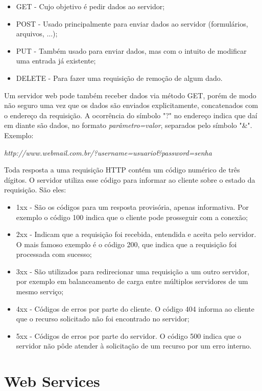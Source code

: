 \begin{itemize}
\item GET - Cujo objetivo é pedir dados ao servidor;
\item POST - Usado principalmente para enviar dados ao servidor (formulários, arquivos, ...);
\item PUT - Também usado para enviar dados, mas com o intuito de modificar uma entrada já existente;
\item DELETE - Para fazer uma requisição de remoção de algum dado.
\end{itemize}
 
Um servidor web pode também receber dados via método GET, porém de modo não seguro uma vez que os dados são enviados explicitamente, concatenados com o endereço da requisição. A ocorrência do símbolo "?" no endereço indica que daí em diante são dados, no formato \emph{parâmetro=valor}, separados pelo símbolo "\&". Exemplo:
\begin{center}
\emph{http://www.webmail.com.br/?username=usuario\&password=senha}
\end{center}

Toda resposta a uma requisição HTTP contém um código numérico de três dígitos. O servidor utiliza esse código para informar ao cliente sobre o estado da requisição. São eles:

\begin{itemize}
\item 1xx - São os códigos para um resposta provisória, apenas informativa. Por exemplo o código 100 indica que o cliente pode prosseguir com a conexão;
\item 2xx - Indicam que a requisição foi recebida, entendida e aceita pelo servidor. O mais famoso exemplo é o código 200, que indica que a requisição foi processada com sucesso;
\item 3xx - São utilizados para redirecionar uma requisição a um outro servidor, por exemplo em balanceamento de carga entre múltiplos servidores de um mesmo serviço;
\item 4xx - Códigos de erros por parte do cliente. O código 404 informa ao cliente que o recurso solicitado não foi encontrado no servidor;
\item 5xx - Códigos de erros por parte do servidor. O código 500 indica que o servidor não pôde atender à solicitação de um recurso por um erro interno.
\end{itemize}

\section{Web Services}

